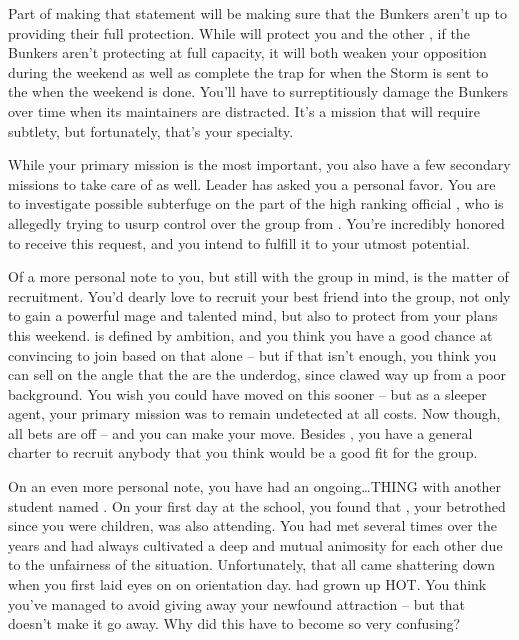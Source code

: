 \documentclass[char]{GL2020}
\begin{document}
Part of making that statement will be making sure that the Bunkers aren’t up to providing their full protection. While \cGenesis{} will protect you and the other \pGoaties{}, if the Bunkers aren’t protecting at full capacity, it will both weaken your opposition during the weekend as well as complete the trap for when the Storm is sent to the \pSc{} when the weekend is done. You’ll have to surreptitiously damage the Bunkers over time when its maintainers are distracted. It’s a mission that will require subtlety, but fortunately, that’s your specialty.
 
While your primary mission is the most important, you also have a few secondary missions to take care of as well. Leader \cChupLeader{} has asked you a personal favor. You are to investigate possible subterfuge on the part of the high ranking official \cChupSecond{}, who is allegedly trying to usurp control over the group from \cChupLeader{}. You’re incredibly honored to receive this request, and you intend to fulfill it to your utmost potential.
 
Of a more personal note to you, but still with the group in mind, is the matter of recruitment. You’d dearly love to recruit your best friend \cAmbition{} into the group, not only to gain a powerful mage and talented mind, but also to protect \cAmbition{\them} from your plans this weekend. \cAmbition{} is defined by \cAmbition{\their} ambition, and you think you have a good chance at convincing \cAmbition{\them} to join based on that alone -- but if that isn’t enough, you think you can sell \cAmbition{\them} on the angle that the \pGoaties{} are the underdog, since \cAmbition{} clawed \cAmbition{\their} way up from a poor background. You wish you could have moved on this sooner -- but as a sleeper agent, your primary mission was to remain undetected at all costs. Now though, all bets are off -- and you can make your move. Besides \cAmbition{}, you have a general charter to recruit anybody that you think would be a good fit for the group.
 
On an even more personal note, you have had an ongoing\ldots THING with another student named \cHeir{}. On your first day at the school, you found that \cHeir{}, your betrothed since you were children, was also attending. You had met several times over the years and had always cultivated a deep and mutual animosity for each other due to the unfairness of the situation. Unfortunately, that all came shattering down when you first laid eyes on \cHeir{\them} on orientation day. \cHeir{} had grown up HOT. You think you’ve managed to avoid giving away your newfound attraction -- but that doesn’t make it go away. Why did this have to become so very confusing?
 
\end{document}
